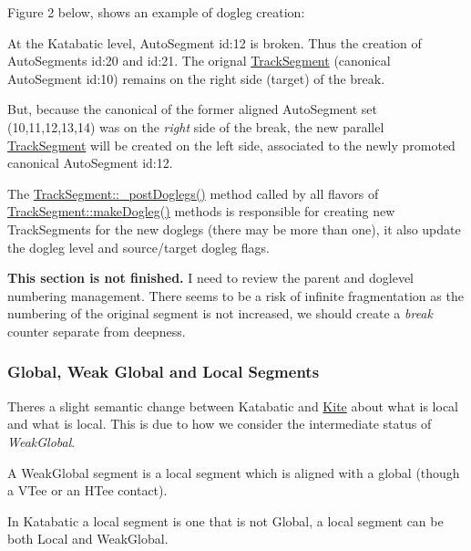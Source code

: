 Figure 2 below, shows an example of dogleg creation\+:
\begin{DoxyItemize}
\item At the Katabatic level, Auto\+Segment {\ttfamily id\+:12} is broken. Thus the creation of Auto\+Segments {\ttfamily id\+:20} and {\ttfamily id\+:21}. The orignal \mbox{\hyperlink{classKite_1_1TrackSegment}{Track\+Segment}} (canonical Auto\+Segment {\ttfamily id\+:10}) remains on the right side (target) of the break.
\item But, because the canonical of the former aligned Auto\+Segment set {\ttfamily }(10,11,12,13,14) was on the {\itshape right} side of the break, the new parallel \mbox{\hyperlink{classKite_1_1TrackSegment}{Track\+Segment}} will be created on the {\ttfamily left} side, associated to the newly promoted canonical Auto\+Segment {\ttfamily id\+:12}.
\end{DoxyItemize}

 The \mbox{\hyperlink{classKite_1_1TrackSegment_a10a45c049d0bd7d01c7eff1c5441c7a2}{Track\+Segment\+::\+\_\+post\+Doglegs()}} method called by all flavors of \mbox{\hyperlink{classKite_1_1TrackSegment_a7a9637875364e84e6862de0102341715}{Track\+Segment\+::make\+Dogleg()}} methods is responsible for creating new Track\+Segments for the new doglegs (there may be more than one), it also update the dogleg level and source/target dogleg flags.

{\bfseries This section is not finished.} I need to review the parent and doglevel numbering management. There seems to be a risk of infinite fragmentation as the numbering of the original segment is not increased, we should create a {\itshape break} counter separate from deepness.\hypertarget{classKite_1_1TrackSegment_secWeakGlobal}{}\subsubsection{Global, Weak Global and Local Segments}\label{classKite_1_1TrackSegment_secWeakGlobal}
There\textquotesingle{}s a slight semantic change between Katabatic and \mbox{\hyperlink{namespaceKite}{Kite}} about what is local and what is local. This is due to how we consider the intermediate status of {\itshape Weak\+Global}.

A {\ttfamily Weak\+Global} segment is a local segment which is aligned with a global (though a V\+Tee or an H\+Tee contact).

In Katabatic a local segment is one that is not {\ttfamily Global}, a local segment can be both {\ttfamily Local} and {\ttfamily Weak\+Global}.

